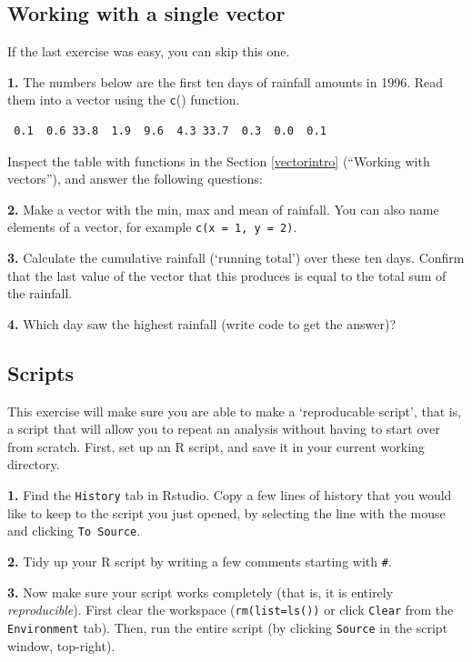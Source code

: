 \documentclass[]{book}
\begin{document}
\hypertarget{vecexerc1}{%
\subsection{Working with a single vector}\label{vecexerc1}}

If the last exercise was easy, you can skip this one.

\textbf{1.} The numbers below are the first ten days of rainfall amounts in 1996. Read them into a vector using the \texttt{c}() function.

\begin{verbatim}
 0.1  0.6 33.8  1.9  9.6  4.3 33.7  0.3  0.0  0.1
\end{verbatim}

Inspect the table with functions in the Section \ref{vectorintro} (``Working with vectors''), and answer the following questions:

\textbf{2.} Make a vector with the min, max and mean of rainfall. You can also name elements of a vector, for example \texttt{c(x\ =\ 1,\ y\ =\ 2)}.

\textbf{3.} Calculate the cumulative rainfall (`running total') over these ten days. Confirm that the last value of the vector that this produces is equal to the total sum of the rainfall.

\textbf{4.} Which day saw the highest rainfall (write code to get the answer)?

\hypertarget{scriptexercise}{%
\subsection{Scripts}\label{scriptexercise}}

This exercise will make sure you are able to make a `reproducable script', that is, a script that will allow you to repeat an analysis without having to start over from scratch. First, set up an R script, and save it in your current working directory.

\textbf{1.} Find the \texttt{History} tab in Rstudio. Copy a few lines of history that you would like to keep to the script you just opened, by selecting the line with the mouse and clicking \texttt{To\ Source}.

\textbf{2.} Tidy up your R script by writing a few comments starting with \texttt{\#}.

\textbf{3.} Now make sure your script works completely (that is, it is entirely \emph{reproducible}). First clear the workspace (\texttt{rm(list=ls())} or click \texttt{Clear} from the \texttt{Environment} tab). Then, run the entire script (by clicking \texttt{Source} in the script window, top-right).
\end{document}
